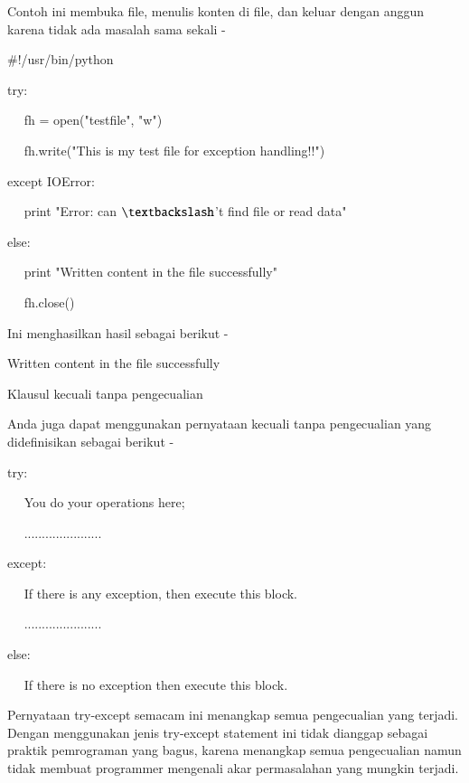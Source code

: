 \documentclass[a4paper,12pt]{report}
\begin{document}
\noindent 
Contoh ini membuka file, menulis konten di file, dan keluar dengan anggun karena tidak ada masalah sama sekali - \par
\vspace{16pt}
\noindent 
 $  \#  $!/usr/bin/python \par
\vspace{12pt}
\noindent 
try: \par
\noindent 
~~ fh = open("testfile", "w") \par
\noindent 
~~ fh.write("This is my test file for exception handling!!") \par
\noindent 
except IOError: \par
\noindent 
~~ print "Error: can $  \textbackslash  $'t find file or read data" \par
\noindent 
else: \par
\noindent 
~~ print "Written content in the file successfully" \par
\noindent 
~~ fh.close() \par
\vspace{16pt}
\noindent 
Ini menghasilkan hasil sebagai berikut - \par
\vspace{12pt}
\noindent 
Written content in the file successfully \par
\vspace{12pt}
\noindent 
Klausul kecuali tanpa pengecualian \par
\vspace{12pt}
\noindent 
Anda juga dapat menggunakan pernyataan kecuali tanpa pengecualian yang didefinisikan sebagai berikut - \par
\vspace{12pt}
\noindent 
try: \par
\noindent 
~~ You do your operations here; \par
\noindent 
~~ ...................... \par
\noindent 
except: \par
\noindent 
~~ If there is any exception, then execute this block. \par
\noindent 
~~ ...................... \par
\noindent 
else: \par
\noindent 
~~ If there is no exception then execute this block.  \par
\vspace{12pt}
\vspace{16pt}
\noindent 
Pernyataan try-except semacam ini menangkap semua pengecualian yang terjadi. Dengan menggunakan jenis try-except statement ini tidak dianggap sebagai praktik pemrograman yang bagus, karena menangkap semua pengecualian namun tidak membuat programmer mengenali akar permasalahan yang mungkin terjadi. \par
\end{document}
